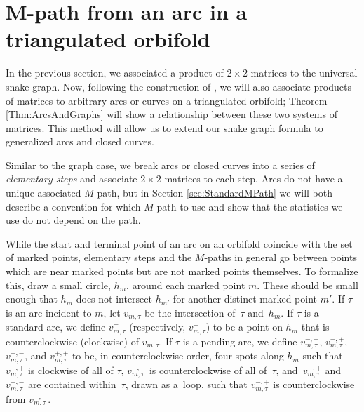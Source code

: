 \documentclass[11pt]{article}
\numberwithin{equation}{section}
\begin{document}
\section[$M$-path from an arc in a triangulated orbifold]{$\boldsymbol{M}$-path from an arc in a triangulated orbifold} \label{sec:$M$-path}

In the previous section, we associated a product of $2 \times 2$ matrices to the universal snake graph. Now, following the construction of \cite{MW}, we will also associate products of matrices to arbitrary arcs or curves on a triangulated orbifold; Theorem \ref{Thm:ArcsAndGraphs} will show a relationship between these two systems of matrices. This method will allow us to extend our snake graph formula to generalized arcs and closed curves.

Similar to the graph case, we break arcs or closed curves into a series of \emph{elementary steps} and associate $2 \times 2$ matrices to each step. Arcs do not have a unique associated $M$-path, but in Section \ref{sec:StandardMPath} we will both describe a convention for which $M$-path to use and show that the statistics we use do not depend on the path.

While the start and terminal point of an arc on an orbifold coincide with the set of marked points, elementary steps and the $M$-paths in general go between points which are near marked points but are not marked points themselves. To formalize this, draw a small circle, $h_m$, around each marked point $m$. These should be small enough that $h_m$ does not intersect $h_{m'}$ for another distinct marked point $m'$. If $\tau$ is an arc incident to $m$, let $v_{m,\tau}$ be the intersection of~$\tau$ and~$h_m$. If $\tau$ is a standard arc, we define $v^+_{m,\tau}$ (respectively, $v^-_{m,\tau}$) to be a point on $h_m$ that is counterclockwise (clockwise) of $v_{m,\tau}$. If $\tau$ is a pending arc, we define $v^{-,-}_{m,\tau}$, $v^{-,+}_{m,\tau}$, $v^{+,-}_{m,\tau}$, and $v^{+,+}_{m,\tau}$ to be, in counterclockwise order, four spots along $h_m$ such that $v^{+,+}_{m,\tau}$ is clockwise of all of $\tau$, $v^{-,-}_{m,\tau}$ is counterclockwise of all of~$\tau$, and~$v^{-,+}_{m,\tau}$ and~$v^{+,-}_{m,\tau}$ are contained within~$\tau$, drawn as a~loop, such that $v^{-,+}_{m,\tau}$ is counterclockwise from $v^{+,-}_{m,\tau}$.
\end{document}
